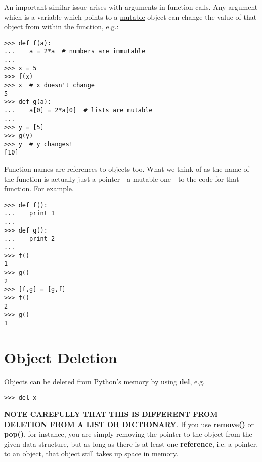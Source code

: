 % 
% 
% 
% 

An important similar issue arises with arguments in function calls.  Any
argument which is a variable which points to a \underline{mutable}
object can change the value of that object from within the function,
e.g.:

\label{sideeffectpage}
\begin{Verbatim}[fontsize=\relsize{-2}]
>>> def f(a):
...    a = 2*a  # numbers are immutable
...
>>> x = 5
>>> f(x)
>>> x  # x doesn't change
5
>>> def g(a):
...    a[0] = 2*a[0]  # lists are mutable
...
>>> y = [5]
>>> g(y)
>>> y  # y changes!
[10]
\end{Verbatim}

Function names are references to objects too.  What we think of as the
name of the function is actually just a pointer---a mutable one---to the
code for that function.  For example,

\begin{Verbatim}[fontsize=\relsize{-2}]
>>> def f():
...    print 1
...
>>> def g():
...    print 2
...
>>> f()
1
>>> g()
2
>>> [f,g] = [g,f]
>>> f()
2
>>> g()
1
\end{Verbatim}

\section{Object Deletion}

Objects can be deleted from Python's memory by  using {\bf del}, e.g.

\begin{Verbatim}[fontsize=\relsize{-2}]
>>> del x
\end{Verbatim}

{\bf NOTE CAREFULLY THAT THIS IS DIFFERENT FROM DELETION FROM A LIST OR
DICTIONARY}.  If you use {\bf remove()} or {\bf pop()}, for instance,
you are simply removing the pointer to the object from the given data
structure, but as long as there is at least one {\bf reference}, i.e. a
pointer, to an object, that object still takes up space in memory.

